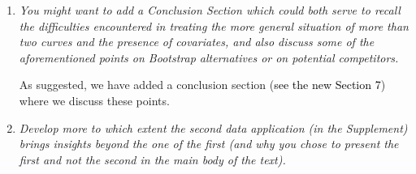 \documentclass[a4paper,12pt]{article}
\newcommand{\reference}[1]{\textcolor{black}{#1}}
\begin{document}
\begin{enumerate}[label=\arabic*.,leftmargin=0.6cm]



\newpage 
\item \textit{You might want to add a Conclusion Section which could both serve to recall the difficulties encountered in treating the more general situation of more than two curves and the presence of
covariates, and also discuss some of the aforementioned points on Bootstrap alternatives or on potential competitors.}  

As suggested, we have added a conclusion section (\reference{see the new Section 7}) where we discuss these points. 


\item \textit{Develop more to which extent the second data application (in the Supplement) brings insights beyond the one of the first (and why you chose to present the first and not the second in the main body of the text).}


\end{enumerate}
\end{document}
